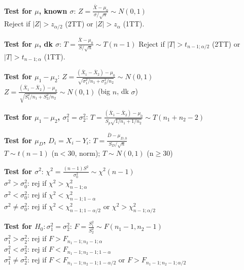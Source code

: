 \documentclass[a4paper,landscape]{article}
\newcommand{\rnname}[1]{\textbf{#1}}
\begin{document}
\begin{multicols*}{4}
\begin{flatitemize}
\item \rnname{Test for $\mu$, known $\sigma$}: $Z = \frac{\bar X - \mu_0}{\sigma / \sqrt{n}} \sim N(0, 1)$ \\ 
Reject if $|Z| > z_{\alpha/2}$ (2TT) or $|Z| > z_{\alpha}$ (1TT).
\item \rnname{Test for $\mu$, dk $\sigma$}: $T = \frac{\bar X - \mu_0}{S/\sqrt{n}} \sim T(n-1)$ Reject if $|T| > t_{n-1;\alpha/2}$ (2TT) or $|T| > t_{n-1;\alpha}$ (1TT).
\item \rnname{Test for $\mu_1 - \mu_2$}: $Z = \frac{(\bar X_1 - \bar X_2) - \mu_0}{\sqrt{\sigma_1^2/n_1 + \sigma_2^2/n_2}} \sim N(0, 1)$ \\
$Z = \frac{(\bar X_1 - \bar X_2) - \mu_0}{\sqrt{S_1^2/n_1 + S_2^2/n_2}} \sim N(0, 1)$ (big $n$, dk $\sigma$)
\item \rnname{Test for $\mu_1 - \mu_2$, $\sigma_1^2 = \sigma_2^2$}:
$T = \frac{(\bar X_1 - \bar X_2) - \mu_0}{S_p\sqrt{1/n_1 + 1/n_2}} \sim T(n_1 + n_2 - 2)$
\item \rnname{Test for $\mu_D$, $D_i = X_i-Y_i$}:
$T = \frac{\bar D - \mu_{D, 0}}{S_D/\sqrt{n}}$ \\
$T \sim t(n-1)$ (n$<$30, norm); $T \sim N(0, 1)$ (n$\geq$30)
\item \rnname{Test for $\sigma^2$}: $\chi^2 = \frac{(n-1)S^2}{\sigma_0^2} \sim \chi^2(n-1)$ \\
$\sigma^2 > \sigma_0^2$: rej if $\chi^2 > \chi^2_{n-1;\alpha}$ \\
$\sigma^2 < \sigma_0^2$: rej if $\chi^2 < \chi^2_{n-1;1-\alpha}$ \\
$\sigma^2 \neq \sigma_0^2$: rej if $\chi^2 < \chi^2_{n-1;1-\alpha/2}$ or $\chi^2 > \chi^2_{n-1;\alpha/2}$
\item \rnname{Test for $H_0: \sigma_1^2 = \sigma_2^2$}:
$F = \frac{S_1^2}{S_2^2} \sim F(n_1-1, n_2-1)$ \\
$\sigma_1^2 > \sigma_2^2$: rej if $F > F_{n_1-1;n_2-1;\alpha}$ \\
$\sigma_1^2 < \sigma_2^2$: rej if $F < F_{n_1-1;n_2-1;1-\alpha}$ \\
$\sigma_1^2 \neq \sigma_2^2$: rej if $F < F_{n_1-1;n_2-1;1-\alpha/2}$ or $F > F_{n_1-1;n_2-1;\alpha/2}$
\end{flatitemize}
\end{multicols*}
\end{document}

